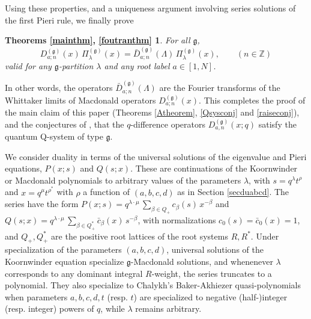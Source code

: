 \documentclass[12pt]{amsart}
\newcommand{\barD}{\bar D}
\newcommand{\g}{{\mathfrak{g}}}
\newcommand{\Z}{{\mathbb Z}}
\newcommand{\lL}{{\Lambda}}
\numberwithin{equation}{section}
\begin{document}
%
%





%



Using these properties, and a uniqueness argument involving series solutions of the first Pieri rule, we finally prove
\newtheorem*{mainthm}{Theorems \ref{mainthm}, \ref{foutranthm}}
\begin{mainthm}
For all $\g$, 
\begin{equation*}
D_{a;n}^{(\g)}(x)\,\Pi_\lambda^{(\g)}(x)=\barD_{a;n}^{(\g)}(\lL)\,\Pi_\lambda^{(\g)}(x),\qquad (n\in\Z)
\end{equation*}
valid for any $\g$-partition $\lambda$ and any root label $a\in [1,N]$.
%
\end{mainthm}
In other words, the operators $\barD_{a;n}^{(\g)}(\lL)$ are the Fourier transforms of the Whittaker limits of Macdonald operators
$D_{a;n}^{(\g)}(x)$.
This completes the proof of the main claim of this paper (Theorems \ref{Atheorem}, \ref{Qsysconj} and \ref{raiseconj}), 
and the conjectures of \cite{DFKconj}, that the $q$-difference operators $D_{a,n}^{(\g)}(x;q)$ satisfy the quantum Q-system of type $\g$.


We consider duality in terms of the universal solutions of the eigenvalue and Pieri equations, $P(x;s)$ and $Q(s;x)$. These are continuations of the Koornwinder or Macdonald polynomials to arbitrary values of the parameters $\lambda$, with $s=q^\lambda t^\rho$ and $x=q^\mu t^{\rho^*}$ with $\rho$ a function of $(a,b,c,d)$ as in Section \ref{secduabcd}. The series have the form $P(x;s)=q^{\lambda\cdot\mu}\,\sum_{\beta\in Q_+} c_\beta(s) \, x^{-\beta}$ and
$Q(s;x)=q^{\lambda\cdot\mu}\,\sum_{\beta\in Q_+^*} \bar c_\beta(x) \, s^{-\beta}$, with normalizations $c_0(s)=\bar c_0(x)=1$, and $Q_+, Q_+^*$ are the positive root lattices of the root systems $R, R^*$. Under specialization of the parameters $(a,b,c,d)$, universal solutions of the Koornwinder equation specialize $\g$-Macdonald solutions, and whenenever $\lambda$ corresponds to any dominant integral $R$-weight, the series truncates to a polynomial. They also specialize to Chalykh's Baker-Akhiezer quasi-polynomials \cite{Chalykh} when parameters $a,b,c,d,t$ (resp. $t$) are specialized to negative (half-)integer (resp. integer) powers of $q$, while $\lambda$ remains arbitrary.
\end{document}
